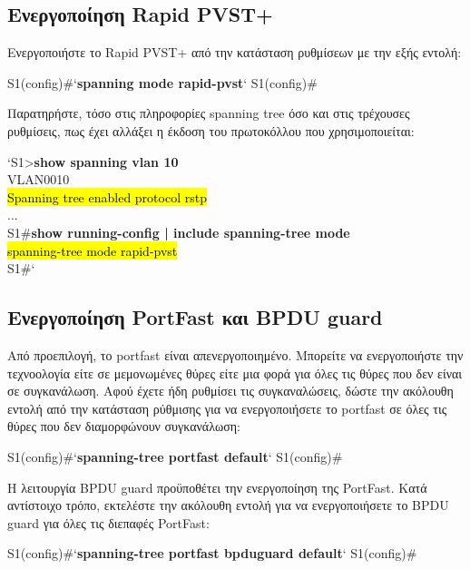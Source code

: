 \documentclass[eforms]{EdipyLabs} %
\begin{document}
\subsection{Ενεργοποίηση Rapid PVST+}
Ενεργοποιήστε το Rapid PVST+ από την κατάσταση ρυθμίσεων με την εξής εντολή:

\begin{CommandBox}
S1(config)#`\textbf{spanning mode rapid-pvst}`
S1(config)#
\end{CommandBox}   

Παρατηρήστε, τόσο στις πληροφορίες spanning tree όσο και στις τρέχουσες ρυθμίσεις, πως έχει αλλάξει η έκδοση του πρωτοκόλλου που χρησιμοποιείται:

\begin{CommandBox}
`S1>\textbf{show spanning vlan 10}\\
	VLAN0010\\
	\tab[0.25cm] \hl{Spanning tree enabled protocol rstp}\\
	\tab[0.25cm] ... \\
	S1\#\textbf{show running-config | include spanning-tree mode}\\
	\hl{spanning-tree mode rapid-pvst}\\
	S1\#`
\end{CommandBox}

\subsection{Ενεργοποίηση PortFast και BPDU guard}

Από προεπιλογή, το portfast είναι απενεργοποιημένο. Μπορείτε να ενεργοποιήστε την τεχνοολογία είτε σε μεμονωμένες θύρες είτε μια φορά για όλες τις θύρες που δεν είναι σε συγκανάλωση. Αφού έχετε ήδη ρυθμίσει τις συγκαναλώσεις, δώστε την ακόλουθη εντολή από την κατάσταση ρύθμισης για να ενεργοποιήσετε το portfast σε όλες τις θύρες που δεν διαμορφώνουν συγκανάλωση:

\begin{CommandBox}
S1(config)#`\textbf{spanning-tree portfast default}`
S1(config)#
\end{CommandBox}   

Η λειτουργία BPDU guard προϋποθέτει την ενεργοποίηση της PortFast. Κατά αντίστοιχο τρόπο, εκτελέστε την ακόλουθη εντολή για να ενεργοποιήσετε το BPDU guard για όλες τις διεπαφές PortFast:

\begin{CommandBox}
S1(config)#`\textbf{spanning-tree portfast bpduguard default}`
S1(config)#
\end{CommandBox}   
\end{document}
